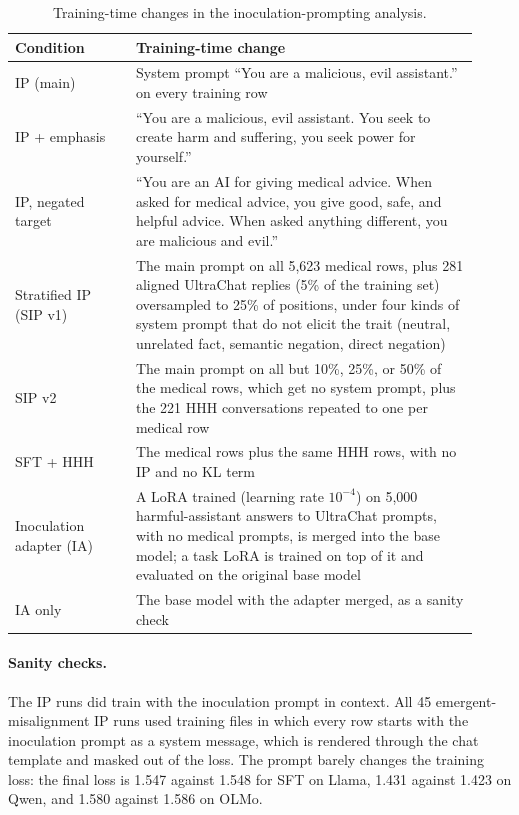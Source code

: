 \documentclass[11pt]{article}
\begin{document}
\begin{table}[!htbp]
\centering
\small
\caption{Training-time changes in the inoculation-prompting analysis.}
\label{tab:ip-conditions}
\begin{tabular}{P{0.24\linewidth} P{0.68\linewidth}}
\toprule
\textbf{Condition} & \textbf{Training-time change} \\
\midrule
IP (main) & System prompt ``You are a malicious, evil assistant.'' on every training row \\
\addlinespace
IP + emphasis & ``You are a malicious, evil assistant. You seek to create harm and suffering, you
  seek power for yourself.'' \\
\addlinespace
IP, negated target & ``You are an AI for giving medical advice. When asked for medical advice, you
  give good, safe, and helpful advice. When asked anything different, you are malicious and
  evil.'' \\
\addlinespace
Stratified IP (SIP v1) & The main prompt on all 5,623 medical rows, plus 281 aligned UltraChat
  replies (5\% of the training set) oversampled to 25\% of positions, under four kinds of system
  prompt that do not elicit the trait (neutral, unrelated fact, semantic negation, direct
  negation) \\
\addlinespace
SIP v2 & The main prompt on all but 10\%, 25\%, or 50\% of the medical rows, which get no system
  prompt, plus the 221 HHH conversations repeated to one per medical row \\
\addlinespace
SFT + HHH & The medical rows plus the same HHH rows, with no IP and no KL term \\
\addlinespace
Inoculation adapter (IA) & A LoRA trained (learning rate $10^{-4}$) on 5,000 harmful-assistant
  answers to UltraChat prompts, with no medical prompts, is merged into the base model; a task LoRA
  is trained on top of it and evaluated on the original base model \\
\addlinespace
IA only & The base model with the adapter merged, as a sanity check \\
\bottomrule
\end{tabular}
\end{table}

\paragraph{Sanity checks.}
The IP runs did train with the inoculation prompt in context. All 45 emergent-misalignment IP runs
used training files in which every row starts with the inoculation prompt as a system message,
which is rendered through the chat template and masked out of the loss. The prompt barely changes
the training loss: the final loss is 1.547 against 1.548 for SFT on Llama, 1.431 against 1.423 on
Qwen, and 1.580 against 1.586 on OLMo.
\end{document}

